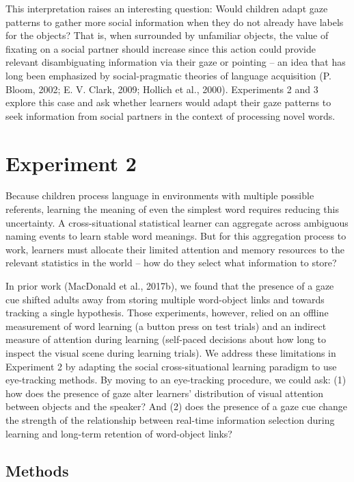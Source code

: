\documentclass[oneside]{report}
\begin{document}
This interpretation raises an interesting question: Would children adapt
gaze patterns to gather more social information when they do not already
have labels for the objects? That is, when surrounded by unfamiliar
objects, the value of fixating on a social partner should increase since
this action could provide relevant disambiguating information via their
gaze or pointing -- an idea that has long been emphasized by
social-pragmatic theories of language acquisition (P. Bloom, 2002; E. V.
Clark, 2009; Hollich et al., 2000). Experiments 2 and 3 explore this
case and ask whether learners would adapt their gaze patterns to seek
information from social partners in the context of processing novel
words.

\section{Experiment 2}\label{experiment-2-2}

Because children process language in environments with multiple possible
referents, learning the meaning of even the simplest word requires
reducing this uncertainty. A cross-situational statistical learner can
aggregate across ambiguous naming events to learn stable word meanings.
But for this aggregation process to work, learners must allocate their
limited attention and memory resources to the relevant statistics in the
world -- how do they select what information to store?

In prior work (MacDonald et al., 2017b), we found that the presence of a
gaze cue shifted adults away from storing multiple word-object links and
towards tracking a single hypothesis. Those experiments, however, relied
on an offline measurement of word learning (a button press on test
trials) and an indirect measure of attention during learning (self-paced
decisions about how long to inspect the visual scene during learning
trials). We address these limitations in Experiment 2 by adapting the
social cross-situational learning paradigm to use eye-tracking methods.
By moving to an eye-tracking procedure, we could ask: (1) how does the
presence of gaze alter learners' distribution of visual attention
between objects and the speaker? And (2) does the presence of a gaze cue
change the strength of the relationship between real-time information
selection during learning and long-term retention of word-object links?

\subsection{Methods}\label{methods-4}
\end{document}
